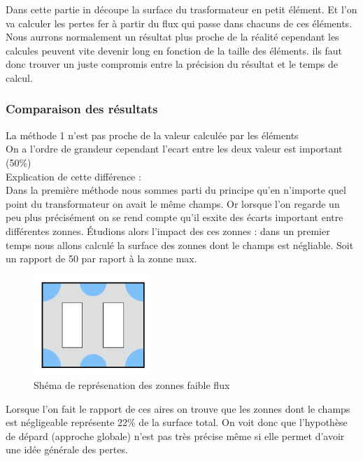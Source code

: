 	Dans cette partie in découpe la surface du trasformateur en petit élément. Et l'on va calculer les pertes fer à partir du flux qui passe dans chacuns de ces éléments. Nous aurrons normalement un résultat plus proche de la réalité cependant les calcules peuvent vite devenir long en fonction de la taille des éléments. ils faut donc trouver un juste compromis entre la précision du résultat et le temps de calcul. 




\subsubsection{Comparaison des résultats}

La méthode 1 n'est pas proche de la valeur calculée par les éléments\\
On a l'ordre de grandeur cependant l'ecart entre les deux valeur est important (50\%)\\

Explication de cette différence : \\
Dans la première méthode nous sommes parti du principe qu'en n'importe quel point du transformateur on avait le même champs. Or lorsque l'on regarde un peu plus précisément on se rend compte qu'il esxite des écarts important entre différentes zonnes.
Étudions alors l'impact des ces zonnes : dans un premier temps nous allons calculé la surface des zonnes dont le champs est négliable. Soit un rapport de 50 par raport à la zonne max.

\begin{figure}[ht]
	\begin{center}
	\includegraphics[width=0.4\textwidth]{images/TP3_zones_mortes}
	\caption{Shéma de représenation des zonnes faible flux}\label{img:RepChamps}
	\end{center}
\end{figure}
\FloatBarrier

Lorsque l'on fait le rapport de ces aires on trouve que les zonnes dont le champs est négligeable représente 22\% de la surface total. On voit donc que l'hypothèse de dépard (approche globale) n'est pas très précise même si elle permet d'avoir une idée générale des pertes.


